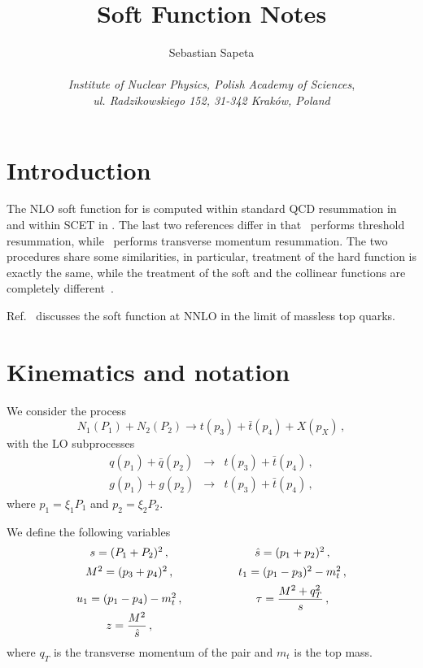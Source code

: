 \documentclass[a4paper,11pt]{report}
\title{\sc Soft Function Notes}
\author{
  Sebastian Sapeta \\ \\
  {\it Institute of Nuclear Physics, Polish Academy of Sciences}, \\ 
  {\it ul. Radzikowskiego 152, 31-342 Krak\'ow, Poland}
}
\numberwithin{equation}{section}
\begin{document}
\maketitle

\tableofcontents

\chapter{Introduction}

The NLO soft function for \ttbar is computed within standard QCD resummation in
\cite{Catani:2014qha} and within SCET in \cite{Ahrens:2010zv, Li:2013mia}. 
%
The last two references differ in that~\cite{Ahrens:2010zv} performs threshold
resummation, while~\cite{Li:2013mia} performs transverse momentum resummation.
The two procedures share some similarities, in particular, treatment of the
hard function is exactly the same, while the treatment of the soft and the
collinear functions are completely different~\cite{Li:2013mia}.

Ref.~\cite{Ferroglia:2012uy} discusses the soft function at NNLO in the limit of
massless top quarks.

\chapter{Kinematics and notation}

We consider the process
%
\begin{equation}
  N_1(P_1) + N_2(P_2) \to t(p_3) + \bar t(p_4) + X(p_X)\,,
\end{equation}
%
with the LO subprocesses
%
\begin{eqnarray}
  q(p_1) + \bar q(p_2) & \to & t(p_3) + \bar t(p_4)\,, \\
  g(p_1) + g(p_2)      & \to & t(p_3) + \bar t(p_4)\,,
\end{eqnarray}
%
where $p_1 = \xi_1 P_1$ and $p_2 = \xi_2 P_2$.

We define the following variables
%
\begin{equation}
  \begin{array}{ccc}
  s = (P_1 + P_2)^2\,,   &\hspace{30pt} & \hat s = (p_1 + p_2)^2\,, \\[0.5em]
  M^2 = (p_3 + p_4)^2\,, &\hspace{30pt} & t_1 = (p_1-p_3)^2 - m_t^2\,, \\[0.5em]
  u_1 = (p_1-p_4) - m_t^2\,,&\hspace{30pt} & 
  \tau = \displaystyle \frac{M^2+q_T^2}{s}\,, \\[0.5em]
  z = \displaystyle \frac{M^2}{{\hat s}}\,, & & 
  \label{eq:kin-var}
\end{array}
\end{equation}
%
where $q_T$ is the transverse momentum of the \ttbar pair and $m_t$ is the top
mass.
\end{document}
